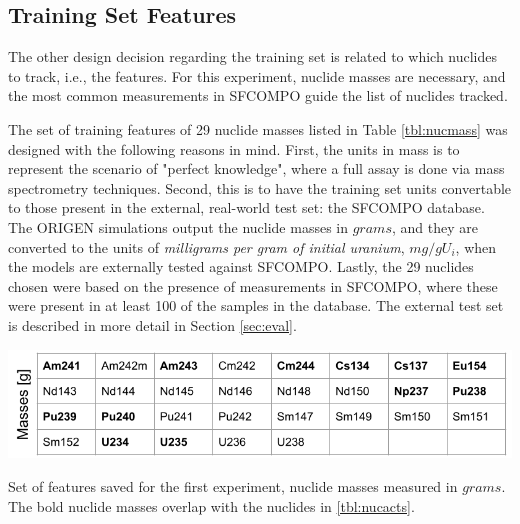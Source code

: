 \subsection{Training Set Features}
\label{sec:snffeats}

The other design decision regarding the training set is related to
which nuclides to track, i.e., the features.  For this experiment, nuclide
masses are necessary, and the most common measurements in \gls{SFCOMPO} guide
the list of nuclides tracked.  

The set of training features of 29 nuclide masses listed in Table
\ref{tbl:nucmass} was designed with the following reasons in mind.  First, the
units in mass is to represent the scenario of "perfect knowledge", where a full
assay is done via mass spectrometry techniques.  Second, this is to have the
training set units convertable to those present in the external, real-world
test set: the \gls{SFCOMPO} database.  The \gls{ORIGEN} simulations output the
nuclide masses in $grams$, and they are converted to the units of
\textit{milligrams per gram of initial uranium}, $mg/gU_i$, when the models are
externally tested against \gls{SFCOMPO}. Lastly, the 29 nuclides chosen were
based on the presence of measurements in \gls{SFCOMPO}, where these were
present in at least 100 of the samples in the database.  The external test set
is described in more detail in Section \ref{sec:eval}.

\begin{table}[!htb]
  \centering
  \includegraphics[width=\linewidth]{./chapters/exp1/nucmass_feats.png}
  \caption{Set of features saved for the first experiment, nuclide masses 
           measured in $grams$. The bold nuclide masses overlap with the 
           nuclides in \ref{tbl:nucacts}.}
  \label{tbl:nucmass}
\end{table}

